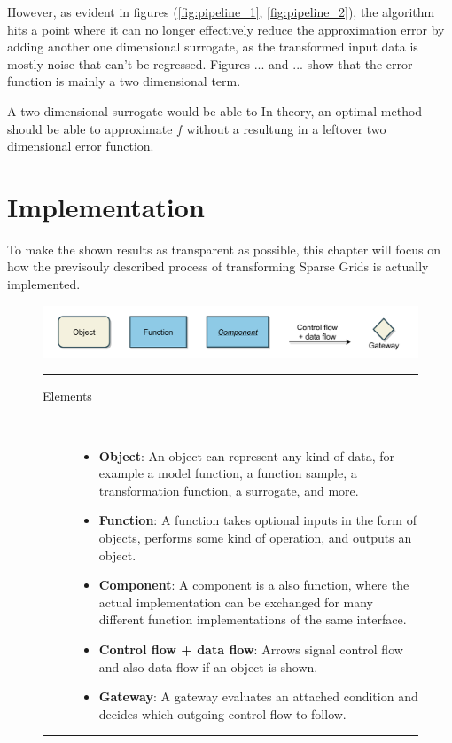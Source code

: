 \documentclass[
  a4paper,  %
  twoside,  %
  bibliography=totoc,
  headsepline,
  cleardoublepage=empty,
  parskip=half,
  draft=false
]{scrbook}
\newcommand{\delimit}{{\color{charcoal}\noindent\rule{\textwidth}{1pt}}}
\begin{document}
However, as evident in figures (\cref{fig:pipeline_1}, \cref{fig:pipeline_2}), the algorithm hits a point where it can no longer effectively reduce the approximation error by adding another one dimensional surrogate, as the transformed input data is mostly noise that can't be regressed.
Figures ... and ... show that the error function is mainly a two dimensional term.


A two dimensional surrogate would be able to 
In theory, an optimal method should be able to approximate $f$ without a resultung in a leftover two dimensional error function.

\chapter{Implementation}
\label{chap:c6}

To make the shown results as transparent as possible, this chapter will focus on how the previsouly described process of transforming Sparse Grids is actually implemented.


\begin{mdframed}[style=style,frametitle={Notation}]
\begin{figure}[H]


\includegraphics[width=\textwidth]{graphics/definitions.pdf}
\vspace{-7.5mm}

\delimit

\vspace{3.5mm}

\begin{description}
\item[Elements] {~ \begin{itemize}[\null]
\item \textbf{Object}: An object can represent any kind of data, for example a model function, a function sample, a transformation function, a surrogate, and more.
\item \textbf{Function}: A function takes optional inputs in the form of objects, performs some kind of operation, and outputs an object.
\item \textbf{Component}: A component is a also function, where the actual implementation can be exchanged for many different function implementations of the same interface.
\item \textbf{Control flow + data flow}: Arrows signal control flow and also data flow if an object is shown.
\item \textbf{Gateway}: A gateway evaluates an attached condition and decides which outgoing control flow to follow.
\end{itemize}}
\end{description}

\delimit

\label{fig:defs}
\end{figure}
\end{mdframed}
\end{document}
